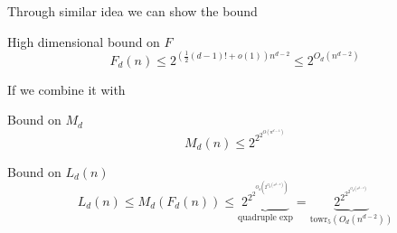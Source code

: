 \begin{frame}{}
    Through similar idea we can show the bound
    \begin{theorem}{High dimensional bound on \(F\)}
        \[F_d(n)\leq 2^{\left(\frac{1}{2}(d-1)!+o(1)\right)n^{d-2}}\leq 2^{O_d(n^{d-2})}\]
    \end{theorem}
    If we combine it with 
    \begin{theorem}{Bound on \(M_d\)}
        \[M_d(n)\leq 2^{2^{2^{O(n^{d-1})}}}\]
    \end{theorem}
    \pause 
    \begin{theorem}{Bound on $L_d(n)$}
        \[L_d(n) \leq M_d(F_d(n)) \leq 
        \underbrace{2^{2^{2^{O_d\left(2^{O_d(n^{d-2})}\right)}}}}_{\text{quadruple exp}}
        = \underbrace{2^{2^{2^{2^{O_d(n^{d-2})}}}}}_{\text{towr}_5(O_d(n^{d-2}))}\]
    \end{theorem}
\end{frame}

